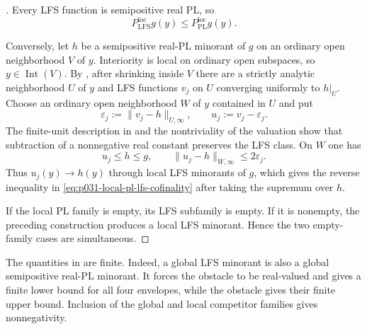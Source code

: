
\begin{proof}[]
Every LFS function is semipositive real PL, so
\[
 P_{\mathrm{LFS}}^{\mathrm{loc}}g(y)
    \leq P_{\mathrm{PL}}^{\mathrm{loc}}g(y).
\]

Conversely, let $h$ be a semipositive real-PL minorant of $g$ on an
ordinary open neighborhood $V$ of $y$.  Interiority is local on ordinary
open subspaces, so $y\in\operatorname{Int}(V)$.  By
\cite[Proposition~7.10, pp.~190--191]{GJR26}, after shrinking inside $V$
there are a strictly analytic neighborhood $U$ of $y$ and LFS functions
$v_j$ on $U$ converging uniformly to $h|_U$.  Choose an ordinary open
neighborhood $W$ of $y$ contained in $U$ and put
\[
 \varepsilon_j:=\lVert v_j-h\rVert_{U,\infty},
 \qquad
 u_j:=v_j-\varepsilon_j.
\]
The finite-unit description in \cite[\S7.9, p.~190]{GJR26} and the
nontriviality of the valuation show that subtraction of a nonnegative real
constant preserves the LFS class.  On $W$ one has
\[
                 u_j\leq h\leq g,
 \qquad
                 \lVert u_j-h\rVert_{W,\infty}
                     \leq2\varepsilon_j.
\]
Thus $u_j(y)\to h(y)$ through local LFS minorants of $g$, which gives the
reverse inequality in \eqref{eq:p031-local-pl-lfs-cofinality} after taking
the supremum over $h$.

If the local PL family is empty, its LFS subfamily is empty.  If it is
nonempty, the preceding construction produces a local LFS minorant.  Hence
the two empty-family cases are simultaneous.
\end{proof}

The quantities in  are finite.
Indeed, a global LFS minorant is also a global semipositive real-PL
minorant.  It forces the obstacle to be real-valued and gives a finite lower
bound for all four envelopes, while the obstacle gives their finite upper
bound.  Inclusion of the global and local competitor families gives
nonnegativity.

